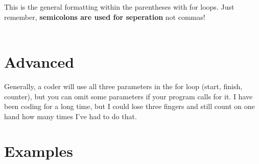 \documentclass[12pt, letterpaper]{article}
\begin{document}
This is the general formatting within the parentheses with for loops. Just remember, \textbf{semicolons are used for seperation} not commas!\\
\\

\section*{Advanced}

Generally, a coder will use all three parameters in the for loop (start, finish, counter), but you can omit some parameters if your program calls for it. I have been coding for a long time, but I could lose three fingers and still count on one hand how many times I've had to do that.

\section*{Examples}
\end{document}
